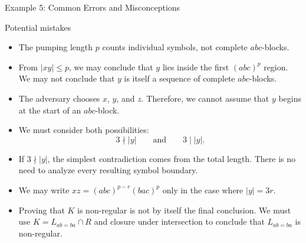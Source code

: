 \documentclass[10pt,aspectratio=169]{beamer}
\begin{document}
\begin{frame}{Example 5: Common Errors and Misconceptions}

\small
\begin{alertblock}{Potential mistakes}
\begin{itemize}
    \item The pumping length \(p\) counts individual symbols, not
    complete \(abc\)-blocks.

    \item From \(|xy|\leq p\), we may conclude that \(y\) lies inside
    the first \((abc)^p\) region. We may not conclude that \(y\) is
    itself a sequence of complete \(abc\)-blocks.

    \item The adversary chooses \(x\), \(y\), and \(z\). Therefore, we
    cannot assume that \(y\) begins at the start of an \(abc\)-block.

    \item We must consider both possibilities:
    \[
    3\nmid |y|
    \qquad\text{and}\qquad
    3\mid |y|.
    \]

    \item If \(3\nmid |y|\), the simplest contradiction comes from the
    total length. There is no need to analyze every resulting symbol
    boundary.

    \item We may write
    \(
    xz=(abc)^{p-r}(bac)^p
    \)
    only in the case where \(|y|=3r\).

    \item Proving that \(K\) is non-regular is not by itself the final
    conclusion. We must use
    \(
    K=L_{ab=ba}\cap R
    \)
    and closure under intersection to conclude that \(L_{ab=ba}\) is
    non-regular.
\end{itemize}
\end{alertblock}

\end{frame}
\end{document}
